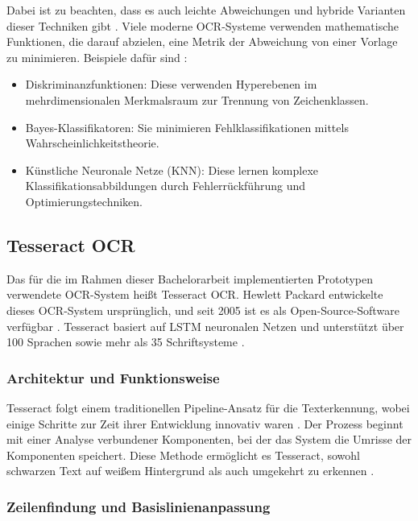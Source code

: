 Dabei ist zu beachten, dass es auch leichte Abweichungen und hybride Varianten dieser Techniken gibt \parencite{BorovikovEugene2014Asom}. Viele moderne \gls{OCR}-Systeme verwenden mathematische Funktionen, die darauf abzielen, eine Metrik der Abweichung von einer Vorlage zu minimieren. Beispiele dafür sind \parencite{BorovikovEugene2014Asom}:

\begin{itemize}
	\item Diskriminanzfunktionen: Diese verwenden Hyperebenen im mehrdimensionalen Merkmalsraum zur Trennung von Zeichenklassen.
	\item Bayes-Klassifikatoren: Sie minimieren Fehlklassifikationen mittels Wahrscheinlichkeitstheorie.
	\item Künstliche Neuronale Netze (KNN): Diese lernen komplexe Klassifikationsabbildungen durch Fehlerrückführung und Optimierungstechniken.
\end{itemize}

\subsection{Tesseract OCR}
\label{subsec:tesseract-ocr}

Das für die im Rahmen dieser Bachelorarbeit implementierten Prototypen verwendete \gls{OCR}-System heißt Tesseract \gls{OCR}. Hewlett Packard entwickelte dieses \gls{OCR}-System ursprünglich, und seit 2005 ist es als Open-Source-Software verfügbar \parencite{SmithR_2007_AOot}. Tesseract basiert auf \gls{LSTM} neuronalen Netzen und unterstützt über 100 Sprachen sowie mehr als 35 Schriftsysteme \parencite{tesseract_ocr_user_manual}. 

\subsubsection{Architektur und Funktionsweise}
\label{subsubsec:architektur-und-funktionsweise}

Tesseract folgt einem traditionellen Pipeline-Ansatz für die Texterkennung, wobei einige Schritte zur Zeit ihrer Entwicklung innovativ waren \parencite{SmithR_2007_AOot}. Der Prozess beginnt mit einer Analyse verbundener Komponenten, bei der das System die Umrisse der Komponenten speichert. Diese Methode ermöglicht es Tesseract, sowohl schwarzen Text auf weißem Hintergrund als auch umgekehrt zu erkennen \parencite{SmithR_2007_AOot}.

\subsubsection{Zeilenfindung und Basislinienanpassung}
\label{subsubsec:zeilenfindung-und-basislinienanpassung}

